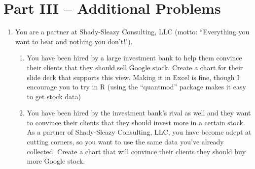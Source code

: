 \documentclass[addpoints,12pt]{exam}
\begin{document}
\section*{Part III -- Additional Problems}
\begin{enumerate}
	\item You are a partner at Shady-Sleazy Consulting, LLC (motto: ``Everything you want to hear and nothing you don't!"\texttrademark). 
	\begin{enumerate}
		\item You have been hired by a large investment bank to help them convince their clients 			that they should sell Google stock. Create a chart for their slide deck that supports this 				view. Making it in Excel is fine, though I encourage you to try in R (using the ``quantmod''			package makes it easy to get stock data)
		\item You have been hired by the investment bank's rival as well and they want to convince 			their clients that they should invest more in a certain stock. As a partner of Shady-Sleazy 				Consulting, LLC, you have become adept at cutting corners, so you want to use the same 				data you've already collected. Create a chart that will convince their clients they should buy 			more Google stock.
	\end{enumerate}
\end{enumerate}
\end{document}
